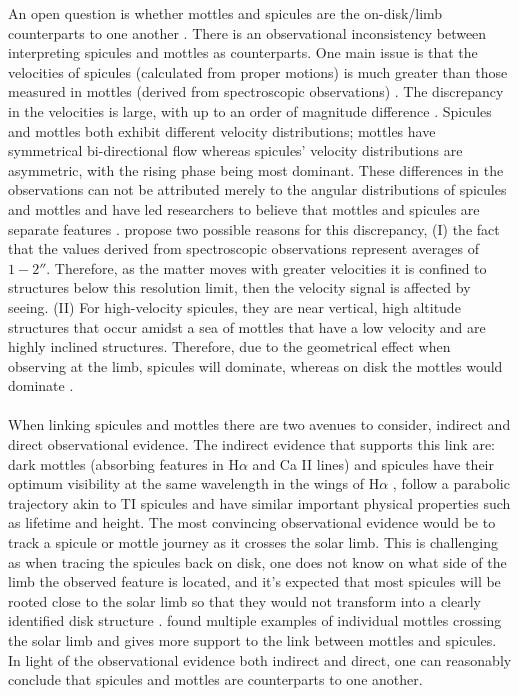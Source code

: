 \documentclass[12pt]{ociamthesis}
\newcommand{\np}{\\ \\}
\begin{document}
% 
An open question is whether mottles and spicules are the on-disk/limb counterparts to one another \citep{Tsiropoula1993A}. There is an observational inconsistency between interpreting spicules and mottles as counterparts. One main issue is that the velocities of spicules (calculated from proper motions) is much greater than those measured in mottles (derived from spectroscopic observations) \citep{Grossmann1992AA264236G, Christopoulou2001SoPh19961C}. The discrepancy in the velocities is large, with up to an order of magnitude difference \citep{Grossmann1973SoPh28319G}. Spicules and mottles both exhibit different velocity distributions; mottles have symmetrical bi-directional flow whereas spicules' velocity distributions are asymmetric, with the rising phase being most dominant. These differences in the observations can not be attributed merely to the angular distributions of spicules and mottles \citep{Grossmann1992AA264236G} and have led researchers to believe that mottles and spicules are separate features \citep{Christopoulou2001SoPh19961C}. \cite{Christopoulou2001SoPh19961C} propose two possible reasons for this discrepancy, (I) the fact that the values derived from spectroscopic observations represent averages of $1-\ang{;;2}$. Therefore, as the matter moves with greater velocities it is confined to structures below this resolution limit, then the velocity signal is affected by seeing. (II) For high-velocity spicules, they are near vertical, high altitude structures that occur amidst a sea of mottles that have a low velocity and are highly inclined structures. Therefore, due to the geometrical effect when observing at the limb, spicules will dominate, whereas on disk the mottles would dominate \citep{Grossmann1992AA264236G}. \np
%
When linking spicules and mottles there are two avenues to consider, indirect and direct observational evidence. The indirect evidence that supports this link are: dark mottles (absorbing features in H$\alpha$ and Ca II lines) and spicules have their optimum visibility at the same wavelength in the wings of H$\alpha$ \citep{Tsiropoula1993A}, follow a parabolic trajectory akin to TI spicules \citep{Rouppe2007ApJ660L169R} and have similar important physical properties such as lifetime and height. The most convincing observational evidence would be to track a spicule or mottle journey as it crosses the solar limb. This is challenging as when tracing the spicules back on disk, one does not know on what side of the limb the observed feature is located, and it's expected that most spicules will be rooted close to the solar limb so that they would not transform into a clearly identified disk structure \citep{Beckers1968}. \cite{Christopoulou2001SoPh19961C} found multiple examples of individual mottles crossing the solar limb and gives more support to the link between mottles and spicules. In light of the observational evidence both indirect and direct, one can reasonably conclude that spicules and mottles are counterparts to one another.
\end{document}
